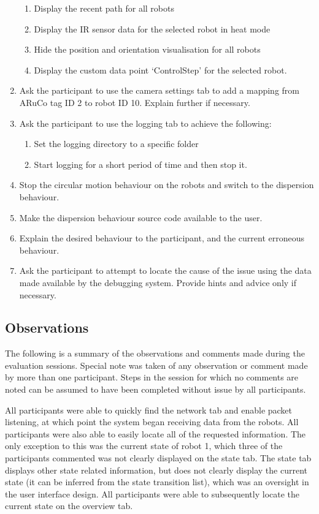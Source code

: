 \begin{enumerate}
\begin{enumerate}
  \item Display the recent path for all robots
  \item Display the IR sensor data for the selected robot in heat mode
  \item Hide the position and orientation visualisation for all robots
  \item Display the custom data point `ControlStep' for the selected robot.
 \end{enumerate}
 \item Ask the participant to use the camera settings tab to add a mapping from ARuCo tag ID 2 to robot ID 10. Explain further if necessary.
 \item Ask the participant to use the logging tab to achieve the following:
 \begin{enumerate}
  \item Set the logging directory to a specific folder
  \item Start logging for a short period of time and then stop it.
 \end{enumerate}
 \item Stop the circular motion behaviour on the robots and switch to the dispersion behaviour.
 \item Make the dispersion behaviour source code available to the user.
 \item Explain the desired behaviour to the participant, and the current erroneous behaviour.
 \item Ask the participant to attempt to locate the cause of the issue using the data made available by the debugging system. Provide hints and advice only if necessary.
\end{enumerate}

\subsection{Observations} \label{UserEvaluationObservations}
The following is a summary of the observations and comments made during the evaluation sessions. Special note was taken of any observation or comment made by more than one participant. Steps in the session for which no comments are noted can be assumed to have been completed without issue by all participants.

All participants were able to quickly find the network tab and enable packet listening, at which point the system began receiving data from the robots. All participants were also able to easily locate all of the requested information. The only exception to this was the current state of robot 1, which three of the participants commented was not clearly displayed on the state tab. The state tab displays other state related information, but does not clearly display the current state (it can be inferred from the state transition list), which was an oversight in the user interface design. All participants were able to subsequently locate the current state on the overview tab.

